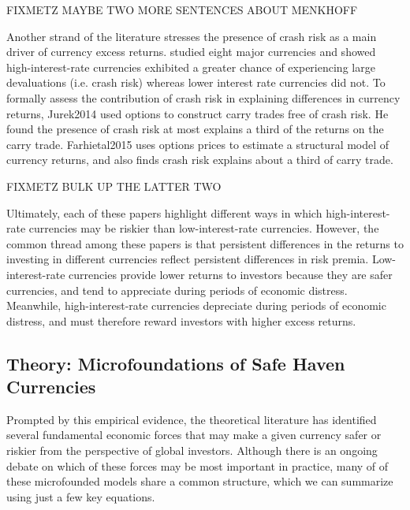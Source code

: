 \documentclass{ar-1col}
\begin{document}
FIXMETZ MAYBE TWO MORE SENTENCES ABOUT MENKHOFF

Another strand of the literature stresses the presence of crash risk 
as a main driver of currency excess returns. \citet{Brunnermeieretal2009} 
studied eight major currencies and showed high-interest-rate currencies 
exhibited a greater chance of experiencing large devaluations 
(i.e. crash risk) whereas lower interest rate currencies did not. 
To formally assess the contribution of crash risk in explaining 
differences in currency returns, Jurek2014 used options to construct 
carry trades free of crash risk. He found the presence of crash risk
at most explains a third of the returns on the carry trade. Farhietal2015
uses options prices to estimate a structural model of currency returns, 
and also finds crash risk explains about a third of carry trade.

FIXMETZ BULK UP THE LATTER TWO


Ultimately, each of these papers highlight different ways in which
high-interest-rate currencies may be riskier than low-interest-rate
currencies. However, the common thread among these papers is that 
persistent differences in the returns to investing in different currencies
reflect persistent differences in risk premia. Low-interest-rate 
currencies provide lower returns to investors because they are safer 
currencies, and tend to appreciate during periods of economic distress.
Meanwhile, high-interest-rate currencies depreciate during periods of 
economic distress, and must therefore reward investors with higher 
excess returns.



\subsection{Theory: Microfoundations of Safe Haven Currencies}

Prompted by this empirical evidence, the theoretical literature has
identified several fundamental economic forces that may make a given
currency safer or riskier from the perspective of global investors.
Although there is an ongoing debate on which of these forces may be
most important in practice, many of of these microfounded models share
a common structure, which we can summarize using just a few key
equations.
\end{document}
